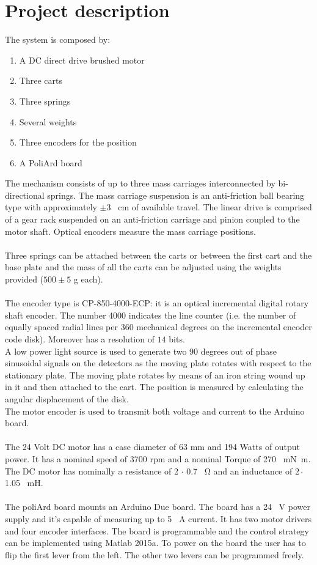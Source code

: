 \chapter{Project description}
The system is composed by:
\begin{enumerate}
\item A DC direct drive brushed motor
\item Three carts
\item Three springs
\item Several weights
\item Three encoders for the position
\item A PoliArd board
\end{enumerate}
The mechanism consists of up to three mass carriages interconnected by bi-directional springs. The mass carriage suspension is an anti-friction ball bearing type with approximately $\pm 3$ \SI{}{\cm} of available travel. The linear drive is comprised of a gear rack suspended on an anti-friction carriage and pinion coupled to the motor shaft. Optical encoders measure the mass carriage positions.\\ \\
Three springs can be attached between the carts or between the first cart and the base plate and the mass of all the carts can be adjusted using the weights provided ($500 \pm 5$ g each).\\ \\
The encoder type is CP-850-4000-ECP: it is an optical incremental digital rotary shaft encoder. The number 4000 indicates the line counter (i.e. the number of equally spaced radial lines per 360 mechanical degrees on the incremental encoder code disk). Moreover has a resolution of $14$ bits.\\A low power light source is used to generate two 90 degrees out of phase sinusoidal signals on the detectors as the moving plate rotates with respect to the stationary plate. The moving plate rotates by means of an iron string wound up in it and then attached to the cart. The position is measured by calculating the angular displacement of the disk.\\
The motor encoder is used to transmit both voltage and current to the Arduino board. \\ \\
The 24 Volt DC motor has a case diameter of 63 mm and 194 Watts of output power. It has a nominal speed of 3700 rpm and a nominal Torque of 270 \SI{}{\milli\newton \meter}. The DC motor has nominally a resistance of 2 $\cdot$ 0.7 \SI{}{\ohm} and an inductance of $2\cdot$ 1.05 \SI{}{\milli \henry}.\\ \\
The poliArd board mounts an Arduino Due board. The board has a 24 \SI{}{\volt} power supply and it’s capable of measuring up to 5 \SI{}{\ampere} current. It has two motor drivers and four encoder interfaces. The board is programmable and the control strategy can be implemented using Matlab 2015a. To power on the board the user has to flip the first lever from the left. The other two levers can be programmed freely.
